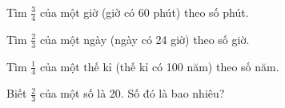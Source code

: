\begin{ex}
Tìm $\frac{3}{4}$ của một giờ (giờ có 60 phút) theo số phút.
\end{ex}

\begin{ex}
Tìm $\frac{2}{3}$ của một ngày (ngày có 24 giờ) theo số giờ.
\end{ex}

\begin{ex}
Tìm $\frac{1}{4}$ của một thế kỉ (thế kỉ có 100 năm) theo số năm.
\end{ex}

\begin{ex}
Biết $\frac{2}{3}$ của một số là 20. Số đó là bao nhiêu?
\end{ex}
